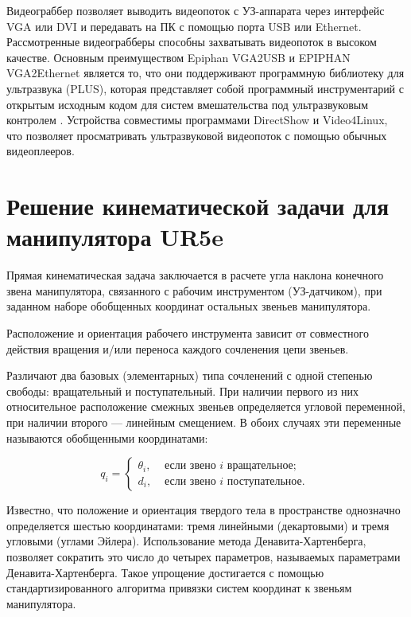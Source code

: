 Видеограббер позволяет выводить видеопоток с УЗ-аппарата через интерфейс VGA или DVI и передавать на ПК с помощью порта USB или Ethernet. Рассмотренные видеограбберы способны захватывать видеопоток в высоком качестве. Основным преимуществом  Epiphan VGA2USB и EPIPHAN VGA2Ethernet является то, что они поддерживают программную библиотеку для ультразвука (PLUS), которая представляет собой программный инструментарий с открытым исходным кодом для систем вмешательства под ультразвуковым контролем \cite{litlink5}. Устройства совместимы программами DirectShow и Video4Linux, что позволяет просматривать ультразвуковой видеопоток с помощью обычных видеоплееров.

\section{Решение кинематической задачи для манипулятора UR5e}

Прямая кинематическая задача заключается в расчете угла наклона конечного звена манипулятора, связанного с рабочим инструментом (УЗ-датчиком), при заданном наборе обобщенных координат остальных звеньев манипулятора.

Расположение и ориентация рабочего инструмента зависит от совместного действия вращения и/или переноса каждого сочленения цепи звеньев.  

Различают два базовых (элементарных) типа сочленений с одной степенью свободы: вращательный и поступательный. При наличии первого из них относительное расположение смежных звеньев определяется угловой переменной, при наличии второго — линейным смещением. В обоих случаях эти переменные называются обобщенными координатами:

\begin{equation}
q_{i}=\left\{\begin{array}{ll}
\theta_{i}, & \text { если звено } i \text { вращательное; } \\
d_{i}, & \text { если звено } i \text { поступательное. }
\end{array}\right.
\end{equation}

Известно, что положение и ориентация твердого тела в пространстве однозначно определяется шестью координатами: тремя линейными (декартовыми) и тремя угловыми (углами Эйлера). Использование метода Денавита-Хартенберга, позволяет сократить это число до четырех параметров, называемых параметрами Денавита-Хартенберга. Такое упрощение достигается с помощью стандартизированного алгоритма привязки систем координат к звеньям манипулятора.

